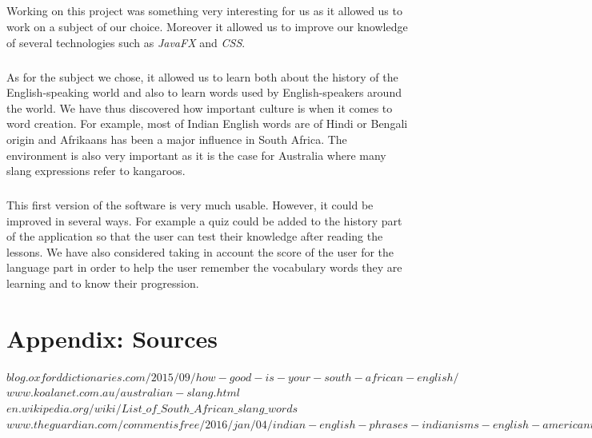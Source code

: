 \documentclass[11pt, a4paper]{report}
\begin{document}
\paragraph{}Working on this project was something very interesting for us as it allowed us to work on a subject of our choice. Moreover it allowed us to improve our knowledge of several technologies such as \textit{JavaFX} and \textit{CSS}.

\paragraph{}As for the subject we chose, it allowed us to learn both about the history of the English-speaking  world and also to learn words used by English-speakers around the world. We have thus discovered how important culture is when it comes to word creation. For example, most of Indian English words are of Hindi or Bengali origin and Afrikaans has been a major influence in South Africa. The environment is also very important as it is the case for Australia where many slang expressions refer to kangaroos.

\paragraph{}This first version of the software is very much usable. However, it could be improved in several ways. For example a quiz could be added to the history part of the application so that the user can test their knowledge after reading the lessons. We have also considered taking in account the score of the user for the language part in order to help the user remember the vocabulary words they are learning and to know their progression.

\chapter*{Appendix: Sources}
\hspace{0.6cm}$blog.oxforddictionaries.com/2015/09/how-good-is-your-south-african-english/$\\

$www.koalanet.com.au/australian-slang.html$\\

$en.wikipedia.org/wiki/List\_of\_South\_African\_slang\_words$\\

$www.theguardian.com/commentisfree/2016/jan/04/indian-english-phrases-indianisms-english-americanisms-vocabulary$\\
\end{document}
